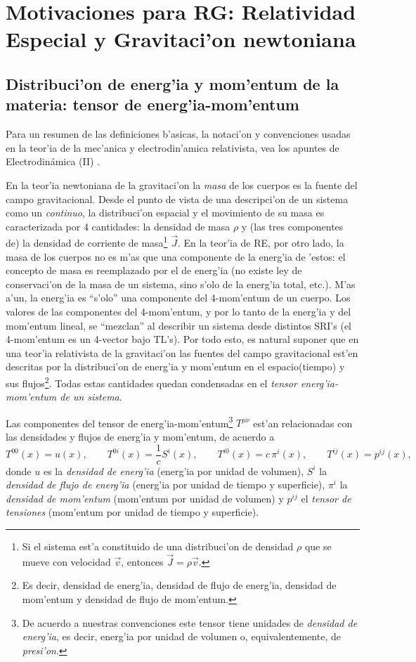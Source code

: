 \chapter{Motivaciones para RG: Relatividad Especial y Gravitaci'on newtoniana}
\section{Distribuci'on de energ'ia y mom'entum de la materia: tensor de energ'ia-mom'entum}

Para un resumen de las definiciones b'asicas, la notaci'on y convenciones usadas en la teor'ia de la mec'anica y electrodin'amica relativista, vea los apuntes de Electrodin\'amica (II) \cite{7}.

En la teor'ia newtoniana de la gravitaci'on la \textit{masa} de los cuerpos es la fuente del campo gravitacional. Desde el punto de vista de una descripci'on de un sistema como un \textit{continuo}, la distribuci'on espacial y el movimiento de su masa es caracterizada por 4 cantidades: la densidad de masa $\rho$ y (las tres componentes de) la densidad de corriente de masa\footnote{Si el sistema est'a constituido de una distribuci'on de densidad $\rho$ que se mueve con velocidad $\vec{v}$, entonces $\vec{J}=\rho\vec{v}$.} $\vec{J}$. En la teor'ia de RE, por otro lado, la masa de los cuerpos no es m'as que una componente de la energ'ia de 'estos: el concepto de masa es reemplazado por el de energ'ia (no existe ley de conservaci'on de la masa de un sistema, sino s'olo de la energ'ia total, etc.). M'as a'un, la energ'ia es ``s'olo'' una componente del 4-mom'entum de un cuerpo. Los valores de las componentes del 4-mom'entum, y por lo tanto de la energ'ia y del mom'entum lineal, se ``mezclan'' al describir un sistema desde distintos SRI's (el 4-mom'entum es un 4-vector bajo TL's). Por todo esto, es natural suponer que en una teor'ia relativista de la gravitaci'on las fuentes del campo gravitacional est'en descritas por la distribuci'on de energ'ia y mom'entum en el espacio(tiempo) y sus flujos\footnote{Es decir, densidad de energ'ia, densidad de flujo de energ'ia, densidad de mom'entum y densidad de flujo de mom'entum.}. Todas estas cantidades quedan condensadas en el \textit{tensor energ'ia-mom'entum de un sistema}.

Las componentes del tensor de energ'ia-mom'entum\footnote{De acuerdo a nuestras convenciones este tensor tiene unidades de \textit{densidad de energ'ia}, es decir, energ'ia por unidad de volumen o, equivalentemente, de \textit{presi'on}.} $T^{\mu\nu}$ est'an relacionadas con las densidades y flujos de energ'ia y mom'entum, de acuerdo a
\begin{equation}
 T^{00}(x)=u(x), \qquad T^{0i}(x)=\frac{1}{c}S^i(x), \qquad T^{i0}(x)=c\,\pi^i(x), \qquad T^{ij}(x)=p^{ij}(x),
\end{equation}
donde $u$ es la \textit{densidad de energ'ia} (energ'ia por unidad de volumen), $S^i$ la \textit{densidad de flujo de energ'ia} (energ'ia por unidad de tiempo y superficie), $\pi^i$ la \textit{densidad de mom'entum} (mom'entum por unidad de volumen) y $p^{ij}$ el \textit{tensor de tensiones} (mom'entum por unidad de tiempo y superficie).


